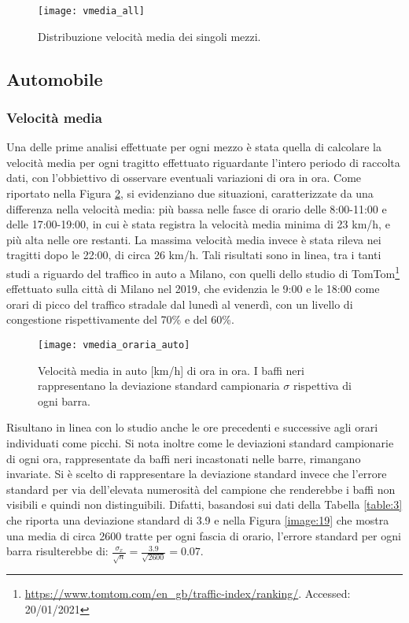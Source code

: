 \begin{figure}
\centering
\texttt{[image: vmedia\_all]}
\caption{Distribuzione velocità media dei singoli mezzi.}
\label{image:26}
\end{figure}

\pagebreak

\subsection{Automobile}

\subsubsection{Velocità media}

Una delle prime analisi effettuate per ogni mezzo è stata quella di calcolare la velocità media per ogni tragitto effettuato riguardante l'intero periodo di raccolta dati, con l'obbiettivo di osservare eventuali variazioni di ora in ora. Come riportato nella Figura \ref{image:3}, si evidenziano due situazioni, caratterizzate da una differenza nella velocità media: più bassa nelle fasce di orario delle 8:00-11:00 e delle 17:00-19:00, in cui è stata registra la velocità media minima di 23 km/h, e più alta nelle ore restanti. La massima velocità media invece è stata rileva nei tragitti dopo le 22:00, di circa 26 km/h. Tali risultati sono in linea, tra i tanti studi a riguardo del traffico in auto a Milano, con quelli dello studio di TomTom\footnote{\url{https://www.tomtom.com/en_gb/traffic-index/ranking/}. Accessed: 20/01/2021} effettuato sulla città di Milano nel 2019, che evidenzia le 9:00 e le 18:00 come orari di picco del traffico stradale dal lunedì al venerdì, con un livello di congestione rispettivamente del 70\% e del 60\%.

\begin{figure}[H]
	\centering
	\texttt{[image: vmedia\_oraria\_auto]}
	\caption{Velocità media in auto [km/h] di ora in ora. I baffi neri rappresentano la deviazione standard campionaria $\sigma$ rispettiva di ogni barra.}
	\label{image:3}
\end{figure}

Risultano in linea con lo studio anche le ore precedenti e successive agli orari individuati come picchi. Si nota inoltre come le deviazioni standard campionarie di ogni ora, rappresentate da baffi neri incastonati nelle barre, rimangano invariate. Si è scelto di rappresentare la deviazione standard invece che l'errore standard per via dell'elevata numerosità del campione che renderebbe i baffi non visibili e quindi non distinguibili. Difatti, basandosi sui dati della Tabella \ref{table:3} che riporta una deviazione standard di 3.9 e nella Figura \ref{image:19} che mostra una media di circa 2600 tratte per ogni fascia di orario, l'errore standard per ogni barra risulterebbe di: $\frac{\sigma_x}{\sqrt{n}} = \frac{3.9}{\sqrt{2600}} = 0.07$.



